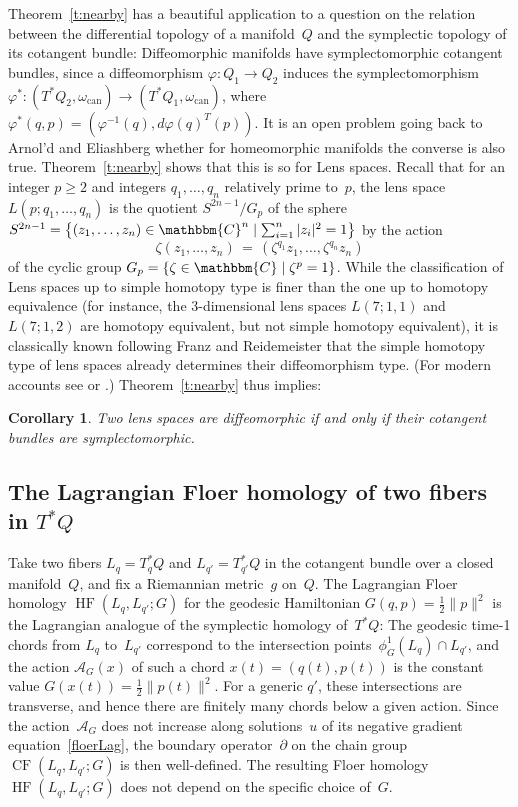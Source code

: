 \documentclass[12pt,twoside]{amsart}
\theoremstyle{plain}
\newtheorem{corollary}[theorem]{Corollary}
\numberwithin{figure}{section}
\numberwithin{equation}{section}
\def\s{\smallskip}
\def\can{\operatorname{can}}
\def\CF{\operatorname{CF}}
\def\HF{\operatorname{HF}}
\def\gf{\varphi}
\def\ca{{\mathcal A}}
\def\CC{\mathbbm{C}}
\def\pp{\partial}
\begin{document}
\s
Theorem~\ref{t:nearby} has a beautiful application to a question on the relation between the
differential topology of a manifold~$Q$ and the symplectic topology of its cotangent bundle:
Diffeomorphic manifolds have symplectomorphic cotangent bundles,
since a diffeomorphism $\gf \colon Q_1 \to Q_2$ induces
the symplectomorphism $\gf^* \colon (T^*Q_2, \omega_{\can}) \to (T^*Q_1, \omega_{\can})$,
where $\gf^* (q,p) = \left( \gf^{-1} (q), d\gf(q)^T (p) \right)$.
It is an open problem going back to Arnol'd and Eliashberg whether for homeomorphic manifolds 
the converse is also true.
%
Theorem~\ref{t:nearby} shows that this is so for Lens spaces.
Recall that for an integer $p \geqslant 2$ and integers $q_1, \dots, q_n$ relatively prime to~$p$,
the lens space $L(p;q_1,\dots,q_n)$ is the quotient $S^{2n-1}/G_p $ of the sphere
$S^{2n-1} = \left\{ (z_1, \dots, z_n) \in \CC^n \mid \sum_{i=1}^n |z_i|^2 =1 \right\}$
by the action
$$
\zeta (z_1, \dots, z_n) \,=\,  (\zeta^{q_1} z_1, \dots, \zeta^{q_n} z_n)
$$
of the cyclic group $G_p = \{ \zeta \in \CC \mid \zeta^p = 1\}$.
While the classification of Lens spaces up to simple homotopy type is finer than 
the one up to homotopy equivalence
(for instance, the 3-dimensional lens spaces $L(7;1,1)$ and~$L(7;1,2)$ are homotopy equivalent, but not simple homotopy equivalent),
it is classically known following Franz and Reidemeister that the simple homotopy type 
of lens spaces already determines their diffeomorphism type. 
(For modern accounts see \cite[\S 9]{Mi66} or \cite[\S 11]{Tu01}.)
Theorem~\ref{t:nearby} thus implies:

\begin{corollary} \label{c:lens}
Two lens spaces are diffeomorphic if and only if their cotangent bundles are symplectomorphic.
\end{corollary}

\subsection{The Lagrangian Floer homology of two fibers in $T^*Q$} \label{s:twofibers}

Take two fibers $L_q = T_q^*Q$ and $L_{q'} = T_{q'}^*Q$ in the cotangent bundle over a closed 
manifold~$Q$, and fix a Riemannian metric~$g$ on~$Q$.
The Lagrangian Floer homology $\HF (L_q, L_{q'}; G)$
for the geodesic Hamiltonian $G(q,p) = \frac 12 \|p\|^2$
is the Lagrangian analogue of the symplectic homology of~$T^*Q$:
%
The geodesic time-1 chords from $L_q$ to~$L_{q'}$ correspond to the intersection points~$\phi_G^1 (L_q) \cap L_{q'}$,
and the action $\ca_G(x)$ of such a chord $x(t) = (q(t),p(t))$ 
is the constant value $G(x(t)) = \frac 12 \|p(t)\|^2$.
For a generic $q'$, these intersections are transverse, 
and hence there are finitely many chords below a given action.
Since the action~$\ca_G$ does not increase along solutions~$u$ of its negative gradient 
equation~\eqref{floerLag}, the boundary operator~$\pp$ on the chain group $\CF (L_q,L_{q'}; G)$ 
is then well-defined.
The resulting Floer homology $\HF (L_q, L_{q'}; G)$ does not depend on the specific choice of~$G$.
\end{document}
